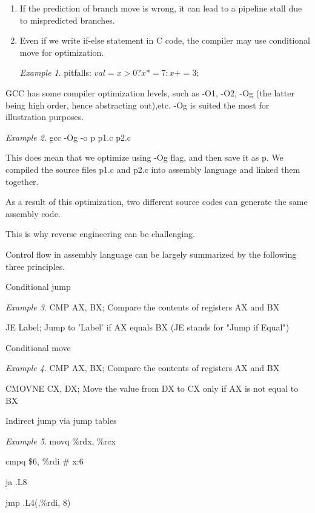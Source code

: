 \documentclass[11pt,reqno]{amsart}
\theoremstyle{remark}
\newtheorem{example}{Example}
\begin{document}
\begin{itemize}
\begin{enumerate}
\item If the prediction of branch move is wrong, it can lead to a pipeline stall due to mispredicted branches.
\item Even if we write if-else statement in C code, the compiler may use conditional move for optimization.
\begin{example}
pitfalls: $val = x>0 ? x*=7 : x+=3;$
\end{example}
\end{enumerate}
\item GCC has some compiler optimization levels, such as -O1, -O2, -Og (the latter being high order, hence abstracting out),etc.
 -Og is suited the most for illustration purposes. 
\begin{example}
\item gcc -Og -o p p1.c p2.c
\item This does mean that we optimize using -Og flag, and then save it as p. We compiled 
the source files p1.c and p2.c into assembly language and linked them together. 
\end{example}
\item As a result of this optimization, two different source codes can generate the same assembly code.
\item This is why reverse engineering can be challenging.
\item Control flow in assembly language can be largely summarized by the following three principles.
\begin{enumerate}
\item Conditional jump
\begin{example}
\item CMP AX, BX; Compare the contents of registers AX and BX
\item JE  Label; Jump to 'Label' if AX equals BX (JE stands for "Jump if Equal")
\end{example}
\item Conditional move
\begin{example}
\item CMP AX, BX; Compare the contents of registers AX and BX
\item CMOVNE CX, DX; Move the value from DX to CX only if AX is not equal to BX
\end{example}
\item Indirect jump via jump tables
\begin{example}
\item movq \%rdx, \%rcx
\item cmpq \$6, \%rdi \# x:6
\item ja      .L8
\item jmp \*.L4(,\%rdi, 8)
\end{example}
\end{enumerate}
\end{itemize}
\end{document}
